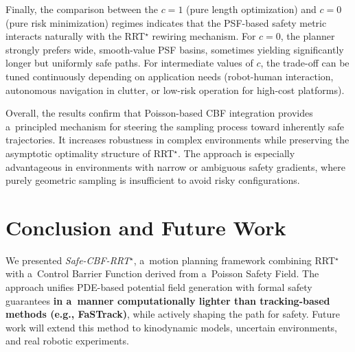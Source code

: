 \documentclass[letterpaper, 10 pt, conference]{ieeeconf}
\begin{document}
Finally, the comparison between the $c=1$ (pure length optimization) and $c=0$
(pure risk minimization) regimes indicates that the PSF-based safety metric
interacts naturally with the RRT$^\star$ rewiring mechanism. For $c=0$, the
planner strongly prefers wide, smooth-value PSF basins, sometimes yielding
significantly longer but uniformly safe paths. For intermediate values of 
$c$, the trade-off can be tuned continuously depending on application needs
(robot-human interaction, autonomous navigation in clutter, or low-risk
operation for high-cost platforms).

Overall, the results confirm that Poisson-based CBF integration provides
a~principled mechanism for steering the sampling process toward inherently
safe trajectories. It increases robustness in complex environments while
preserving the asymptotic optimality structure of RRT$^\star$. The approach
is especially advantageous in environments with narrow or ambiguous safety
gradients, where purely geometric sampling is insufficient to avoid risky
configurations.

\section{Conclusion and Future Work}
We presented \emph{Safe-CBF-RRT$^\star$}, a~motion planning framework combining RRT$^\star$
with a~Control Barrier Function derived from a~Poisson Safety Field. The
approach unifies PDE-based potential field generation with formal safety
guarantees \textbf{in a~manner computationally lighter than tracking-based methods (e.g., FaSTrack)}, while actively shaping the path for safety. Future work will extend this method to kinodynamic models, uncertain
environments, and real robotic experiments.



\end{document}
